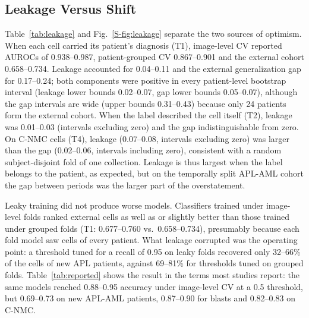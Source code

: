 \documentclass[journal]{IEEEtran}
\begin{document}
\subsection{Leakage Versus Shift}
Table~\ref{tab:leakage} and Fig.~\ref{S-fig:leakage} separate the two sources of optimism. When each cell carried its patient's diagnosis (T1), image-level CV reported AUROCs of 0.938--0.987, patient-grouped CV 0.867--0.901 and the external cohort 0.658--0.734. Leakage accounted for 0.04--0.11 and the external generalization gap for 0.17--0.24; both components were positive in every patient-level bootstrap interval (leakage lower bounds 0.02--0.07, gap lower bounds 0.05--0.07), although the gap intervals are wide (upper bounds 0.31--0.43) because only 24 patients form the external cohort. When the label described the cell itself (T2), leakage was 0.01--0.03 (intervals excluding zero) and the gap indistinguishable from zero. On C-NMC cells (T4), leakage (0.07--0.08, intervals excluding zero) was larger than the gap (0.02--0.06, intervals including zero), consistent with a random subject-disjoint fold of one collection. Leakage is thus largest when the label belongs to the patient, as expected, but on the temporally split APL-AML cohort the gap between periods was the larger part of the overstatement.

Leaky training did not produce worse models. Classifiers trained under image-level folds ranked external cells as well as or slightly better than those trained under grouped folds (T1: 0.677--0.760 vs.\ 0.658--0.734), presumably because each fold model saw cells of every patient. What leakage corrupted was the operating point: a threshold tuned for a recall of 0.95 on leaky folds recovered only 32--66\% of the cells of new APL patients, against 69--81\% for thresholds tuned on grouped folds. Table~\ref{tab:reported} shows the result in the terms most studies report: the same models reached 0.88--0.95 accuracy under image-level CV at a 0.5 threshold, but 0.69--0.73 on new APL-AML patients, 0.87--0.90 for blasts and 0.82--0.83 on C-NMC.




\end{document}
